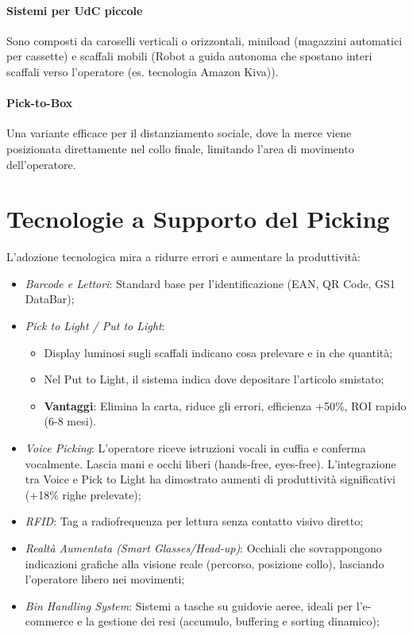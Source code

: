 \paragraph{Sistemi per UdC piccole} Sono composti da caroselli verticali o orizzontali, miniload (magazzini automatici per cassette) e scaffali mobili (Robot a guida autonoma che spostano interi scaffali verso l'operatore (es. tecnologia Amazon Kiva)).

%
\paragraph{Pick-to-Box} Una variante efficace per il distanziamento sociale, dove la merce viene posizionata direttamente nel collo finale, limitando l'area di movimento dell'operatore.

%
\section{Tecnologie a Supporto del Picking}
L'adozione tecnologica mira a ridurre errori e aumentare la produttività:
\begin{itemize}
    \item \emph{Barcode e Lettori}: Standard base per l'identificazione (EAN, QR Code, GS1 DataBar);
    \item \emph{Pick to Light / Put to Light}:
          \begin{itemize}
              \item Display luminosi sugli scaffali indicano cosa prelevare e in che quantità;
              \item Nel Put to Light, il sistema indica dove depositare l'articolo smistato;
              \item \textbf{Vantaggi}: Elimina la carta, riduce gli errori, efficienza +50\%, ROI rapido (6-8 mesi).
          \end{itemize}
    \item \emph{Voice Picking}: L'operatore riceve istruzioni vocali in cuffia e conferma vocalmente. Lascia mani e occhi liberi (hands-free, eyes-free). L'integrazione tra Voice e Pick to Light ha dimostrato aumenti di produttività significativi (+18\% righe prelevate);
    \item \emph{RFID}: Tag a radiofrequenza per lettura senza contatto visivo diretto;
    \item \emph{Realtà Aumentata (Smart Glasses/Head-up)}: Occhiali che sovrappongono indicazioni grafiche alla visione reale (percorso, posizione collo), lasciando l'operatore libero nei movimenti;
    \item \emph{Bin Handling System}: Sistemi a tasche su guidovie aeree, ideali per l'e-commerce e la gestione dei resi (accumulo, buffering e sorting dinamico);
\end{itemize}

